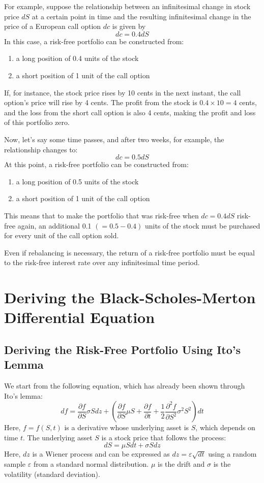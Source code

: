 \documentclass[uplatex]{jsarticle}
\begin{document}
\bigskip

For example, suppose the relationship between an infinitesimal change in stock price $dS$ at a certain point in time and the resulting infinitesimal change in the price of a European call option $dc$ is given by
$$
	dc = 0.4 dS
$$
In this case, a risk-free portfolio can be constructed from:
\begin{enumerate}
	\item a long position of 0.4 units of the stock
	\item a short position of 1 unit of the call option
\end{enumerate}

If, for instance, the stock price rises by 10 cents in the next instant, the call option's price will rise by 4 cents. The profit from the stock is $0.4 \times 10 = 4$ cents, and the loss from the short call option is also 4 cents, making the profit and loss of this portfolio zero.

Now, let's say some time passes, and after two weeks, for example, the relationship changes to:
$$
	dc = 0.5 dS
$$
At this point, a risk-free portfolio can be constructed from:
\begin{enumerate}
	\item a long position of 0.5 units of the stock
	\item a short position of 1 unit of the call option
\end{enumerate}
This means that to make the portfolio that was risk-free when $dc = 0.4 dS$ risk-free again, an additional 0.1 $(=0.5-0.4)$ units of the stock must be purchased for every unit of the call option sold.

Even if rebalancing is necessary, the return of a risk-free portfolio must be equal to the risk-free interest rate over any infinitesimal time period.

\section{Deriving the Black-Scholes-Merton Differential Equation}

\subsection{Deriving the Risk-Free Portfolio Using Ito's Lemma}

We start from the following equation, which has already been shown through Ito's lemma:
$$
	df = \dfrac{\partial f}{\partial S} \sigma S dz + \left( \dfrac{\partial f}{\partial S} \mu S + \dfrac{\partial f}{\partial t} + \dfrac{1}{2} \dfrac{\partial^{2} f}{\partial S^{2}} \sigma^{2} S^{2} \right) dt
$$
Here, $f=f(S,t)$ is a derivative whose underlying asset is $S$, which depends on time $t$. The underlying asset $S$ is a stock price that follows the process:
$$
	dS = \mu S dt + \sigma S dz
$$
Here, $dz$ is a Wiener process and can be expressed as $dz = \varepsilon \sqrt{dt}$ using a random sample $\varepsilon$ from a standard normal distribution. $\mu$ is the drift and $\sigma$ is the volatility (standard deviation).
\end{document}
